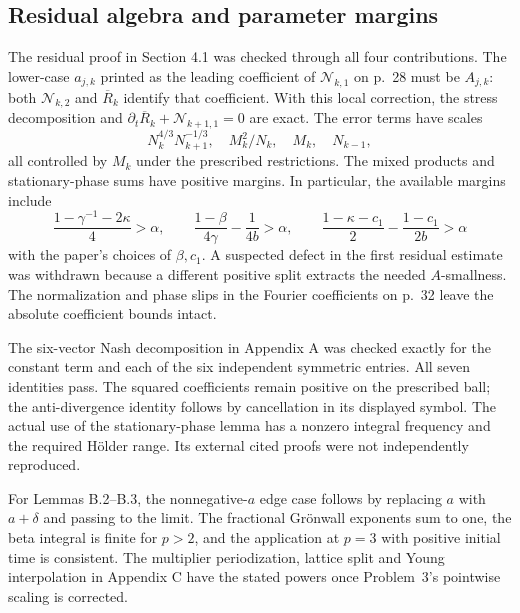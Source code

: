 \documentclass[10pt]{article}
\begin{document}
\subsection*{Residual algebra and parameter margins}
The residual proof in Section 4.1 was checked through all four contributions. The lower-case \(a_{j,k}\) printed as the leading coefficient of \(\mathcal N_{k,1}\) on p. 28 must be \(A_{j,k}\): both \(\mathcal N_{k,2}\) and \(\overline R_k\) identify that coefficient. With this local correction, the stress decomposition and \(\partial_t\overline R_k+\mathcal N_{k+1,1}=0\) are exact. The error terms have scales \[N_k^{4/3}N_{k+1}^{-1/3},\quad M_k^2/N_k,\quad M_k,\quad N_{k-1},\] all controlled by \(M_k\) under the prescribed restrictions. The mixed products and stationary-phase sums have positive margins. In particular, the available margins include \[\frac{1-\gamma^{-1}-2\kappa}{4}>\alpha,\qquad
 \frac{1-\beta}{4\gamma}-\frac1{4b}>\alpha,\qquad
 \frac{1-\kappa-c_1}{2}-\frac{1-c_1}{2b}>\alpha\] with the paper’s choices of \(\beta,c_1\). A suspected defect in the first residual estimate was withdrawn because a different positive split extracts the needed \(A\)-smallness. The normalization and phase slips in the Fourier coefficients on p. 32 leave the absolute coefficient bounds intact.\par
The six-vector Nash decomposition in Appendix A was checked exactly for the constant term and each of the six independent symmetric entries. All seven identities pass. The squared coefficients remain positive on the prescribed ball; the anti-divergence identity follows by cancellation in its displayed symbol. The actual use of the stationary-phase lemma has a nonzero integral frequency and the required Hölder range. Its external cited proofs were not independently reproduced.\par
For Lemmas B.2–B.3, the nonnegative-\(a\) edge case follows by replacing \(a\) with \(a+\delta\) and passing to the limit. The fractional Grönwall exponents sum to one, the beta integral is finite for \(p>2\), and the application at \(p=3\) with positive initial time is consistent. The multiplier periodization, lattice split and Young interpolation in Appendix C have the stated powers once Problem 3’s pointwise scaling is corrected.\par
\end{document}
